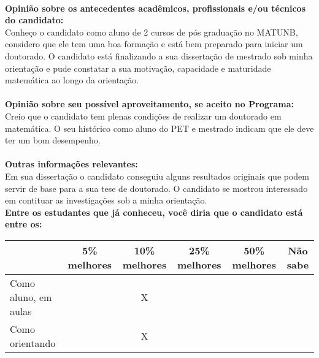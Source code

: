 \documentclass[11pt]{article}
\begin{document}
\\
\textbf{Opinião sobre os antecedentes acadêmicos, profissionais e/ou técnicos do candidato:}
\\Conheço o candidato como aluno de 2 cursos de pós graduação no MATUNB,
considero que ele tem uma boa formação e está bem preparado para iniciar um doutorado.
O candidato está finalizando a sua dissertação de mestrado sob minha orientação e pude constatar a sua motivação, capacidade e maturidade matemática ao longo da orientação.\\
\\
\textbf{Opinião sobre seu possível aproveitamento, se aceito no Programa:}
\\Creio que o candidato tem plenas condições de realizar um doutorado em matemática. O seu histórico como aluno do PET e mestrado indicam que ele deve ter um bom desempenho. \\ 
\\
\textbf{Outras informações relevantes:} \\Em sua dissertação o candidato conseguiu alguns resultados originais que podem servir de base para a sua tese de doutorado. O candidato se mostrou interessado em contituar as investigações sob a minha orientação. 
\\[0.3cm]
\textbf{Entre os estudantes que já conheceu, você diria que o candidato está entre os:}
\\
\begin{tabular}{|l|c|c|c|c|c|}
\hline
 & 5\% melhores & 10\% melhores & 25\% melhores & 50\% melhores & Não sabe \\
\hline
Como aluno, em aulas &  & X &  &  & \\
\hline
Como orientando &  & X &  &  & \\
\hline
\end{tabular}
\end{document}
